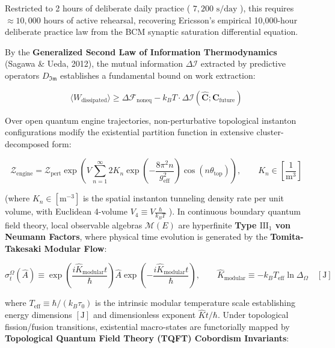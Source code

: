 \documentclass[11pt,a4paper]{article}
\theoremstyle{definition}
\theoremstyle{remark}
\begin{document}
Restricted to 2 hours of deliberate daily practice ( $7{,}200\text{ s/day}$ ), this requires $\approx 10{,}000\text{ hours}$ of active rehearsal, recovering Ericsson's empirical 10,000-hour deliberate practice law from the BCM synaptic saturation differential equation.

By the \textbf{Generalized Second Law of Information Thermodynamics} (Sagawa \& Ueda, 2012), the mutual information $\Delta \mathcal{I}$ extracted by predictive operators $D_{\mathfrak{Im}}$ establishes a fundamental bound on work extraction:


\begin{equation}
\langle W_{\text{dissipated}} \rangle \ge \Delta \mathcal{F}_{\text{noneq}} - k_B T \cdot \Delta \mathcal{I}(\hat{\mathbf{C}}; \mathbf{C}_{\text{future}})
\end{equation}


Over open quantum engine trajectories, non-perturbative topological instanton configurations modify the existential partition function in extensive cluster-decomposed form:


\begin{equation}
\boxed{\mathcal{Z}_{\text{engine}} = \mathcal{Z}_{\text{pert}} \exp\left( V \sum_{n=1}^\infty 2 K_n \exp\left( -\frac{8\pi^2 n}{g_{\text{eff}}^2} \right) \cos\left( n \theta_{\text{top}} \right) \right), \qquad K_n \in [\frac{1}{\mathrm{m^3}}]}
\end{equation}


(where $K_n \in [\mathrm{m^{-3}}]$ is the spatial instanton tunneling density rate per unit volume, with Euclidean 4-volume $V_4 \equiv V \frac{\hbar}{k_B T}$ ).
In continuous boundary quantum field theory, local observable algebras $\mathcal{M}(E)$ are hyperfinite \textbf{Type $\mathrm{III}_1$ von Neumann Factors}, where physical time evolution is generated by the \textbf{Tomita-Takesaki Modular Flow}:


\begin{equation}
\boxed{\sigma_t^{\Omega}(\hat{A}) \equiv \exp\left( \frac{i \hat{K}_{\text{modular}} t}{\hbar} \right) \hat{A} \exp\left( -\frac{i \hat{K}_{\text{modular}} t}{\hbar} \right), \qquad \hat{K}_{\text{modular}} \equiv -k_B T_{\text{eff}} \ln \Delta_{\Omega} \quad [\mathrm{J}]}
\end{equation}


where $T_{\text{eff}} \equiv \hbar / (k_B \tau_0)$ is the intrinsic modular temperature scale establishing energy dimensions $[\mathrm{J}]$ and dimensionless exponent $\hat{K}t/\hbar$. Under topological fission/fusion transitions, existential macro-states are functorially mapped by \textbf{Topological Quantum Field Theory (TQFT) Cobordism Invariants}:
\end{document}
